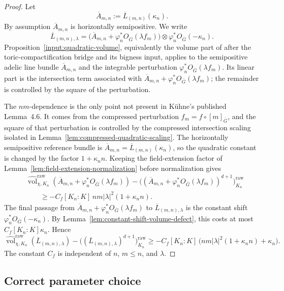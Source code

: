\documentclass[10pt,a4paper]{amsart}
\theoremstyle{plain}
\theoremstyle{plain}
\numberwithin{equation}{section}
\providecommand{\ol}{\overline}
\begin{document}
\begin{proof}
	Let
	\[
	\ol A_{m,n}:=\ol L_{(m,n)}(\kappa_n).
	\]
	By assumption \(\ol A_{m,n}\) is horizontally semipositive.  We write
	\[
	\ol L_{(m,n),\lambda}
	=
	\bigl(\ol A_{m,n}+\varphi_n^*O_{\ol G}(\lambda f_m)\bigr)
	\otimes\varphi_n^*O_{\ol G}(-\kappa_n).
	\]
	Proposition~\ref{input:quadratic-volume}, equivalently the volume part of
	\cite[Lemma~4.6]{Ku1} after the toric-compactification bridge and its
	\cite[Lemma~2.6]{Ku1} bigness input, applies to the semipositive adelic line
	bundle \(\ol A_{m,n}\) and the integrable perturbation
	\(\varphi_n^*O_{\ol G}(\lambda f_m)\).  Its linear part is the
	intersection term
	associated with
	\(\ol A_{m,n}+\varphi_n^*O_{\ol G}(\lambda f_m)\); the remainder is controlled
	by the square of the perturbation.
	
	The \(nm\)-dependence is the only point not present in K\"uhne's published
	Lemma~4.6.  It comes from the compressed perturbation
	\(f_m=f\circ[m]_{\ol G}\), and the square of that perturbation is controlled by
	the compressed intersection scaling isolated in
	Lemma~\ref{lem:compressed-quadratic-scaling}.
	The horizontally semipositive reference bundle is
	\(\ol A_{m,n}=\ol L_{(m,n)}(\kappa_n)\), so the quadratic constant is changed by
	the factor \(1+\kappa_n n\).  Keeping the field-extension factor of
	Lemma~\ref{lem:field-extension-normalization} before normalization gives
	\[
	\begin{aligned}
		&\widehat{\operatorname{vol}}_{\chi,K_n}^{\mathrm{raw}}
		(\ol A_{m,n}+\varphi_n^*O_{\ol G}(\lambda f_m))
		-\bigl((\ol A_{m,n}+\varphi_n^*O_{\ol G}(\lambda f_m))^{d+1}
		\bigr)^{\mathrm{raw}}_{K_n} \\
		&\qquad\ge
		-C_f [K_n:K]\, nm|\lambda|^2(1+\kappa_n n).
	\end{aligned}
	\]
	The final passage from \(\ol A_{m,n}+\varphi_n^*O_{\ol G}(\lambda f_m)\) to
	\(\ol L_{(m,n),\lambda}\) is the constant shift
	\(\varphi_n^*O_{\ol G}(-\kappa_n)\).  By
	Lemma~\ref{lem:constant-shift-volume-defect}, this costs at most
	\(C_f[K_n:K]\kappa_n\).  Hence
	\[
	\widehat{\operatorname{vol}}_{\chi,K_n}^{\mathrm{raw}}(\ol L_{(m,n),\lambda})
	-\bigl((\ol L_{(m,n),\lambda})^{d+1}\bigr)^{\mathrm{raw}}_{K_n}
	\ge
	-C_f [K_n:K]\,
	\bigl(nm|\lambda|^2(1+\kappa_n n)+\kappa_n\bigr).
	\]
	The constant \(C_f\) is independent of \(n\), \(m\le n\), and \(\lambda\).
\end{proof}

\subsection{Correct parameter choice}
\end{document}
